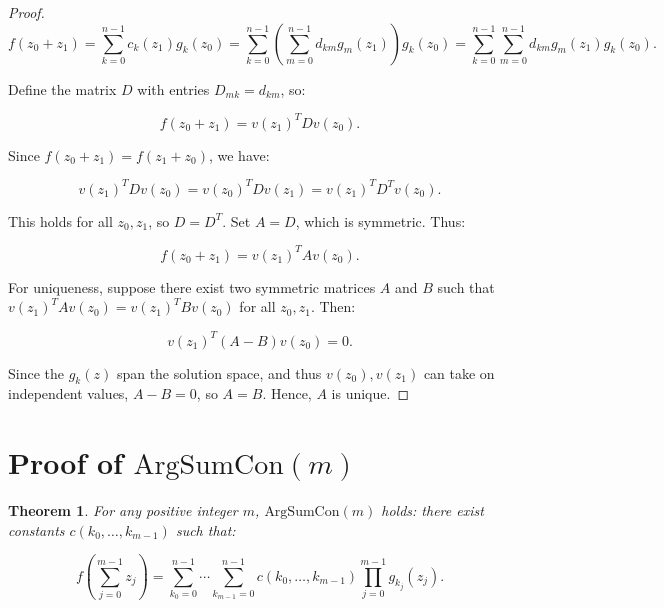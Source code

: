 \documentclass{article}
\newtheorem{theorem}{Theorem}
\begin{document}
\begin{proof}
		\begin{equation}
			f(z_0 + z_1) = \sum_{k=0}^{n-1} c_k(z_1) g_k(z_0) = \sum_{k=0}^{n-1} \left( \sum_{m=0}^{n-1} d_{km} g_m(z_1) \right) g_k(z_0) = \sum_{k=0}^{n-1} \sum_{m=0}^{n-1} d_{km} g_m(z_1) g_k(z_0).
		\end{equation}
		
		Define the matrix \(D\) with entries \(D_{mk} = d_{km}\), so:
		
		\begin{equation}
			f(z_0 + z_1) = v(z_1)^T D v(z_0).
		\end{equation}
		
		Since \(f(z_0 + z_1) = f(z_1 + z_0)\), we have:
		
		\begin{equation}
			v(z_1)^T D v(z_0) = v(z_0)^T D v(z_1) = v(z_1)^T D^T v(z_0).
		\end{equation}
		
		This holds for all \(z_0, z_1\), so \(D = D^T\). Set \(A = D\), which is symmetric. Thus:
		
		\begin{equation}
			f(z_0 + z_1) = v(z_1)^T A v(z_0).
		\end{equation}
		
		For uniqueness, suppose there exist two symmetric matrices \(A\) and \(B\) such that \(v(z_1)^T A v(z_0) = v(z_1)^T B v(z_0)\) for all \(z_0, z_1\). Then:
		
		\begin{equation}
			v(z_1)^T (A - B) v(z_0) = 0.
		\end{equation}
		
		Since the \(g_k(z)\) span the solution space, and thus \(v(z_0), v(z_1)\) can take on independent values, \(A - B = 0\), so \(A = B\). Hence, \(A\) is unique.
	\end{proof}
	
	\section{Proof of \(\text{ArgSumCon}(m)\)}
	
	\begin{theorem}
		For any positive integer \(m\), \(\text{ArgSumCon}(m)\) holds: there exist constants \(c(k_0, \ldots, k_{m-1})\) such that:
		
		\begin{equation}
			f\left( \sum_{j=0}^{m-1} z_j \right) = \sum_{k_0=0}^{n-1} \cdots \sum_{k_{m-1}=0}^{n-1} c(k_0, \ldots, k_{m-1}) \prod_{j=0}^{m-1} g_{k_j}(z_j).
		\end{equation}
	\end{theorem}
	
\end{document}
